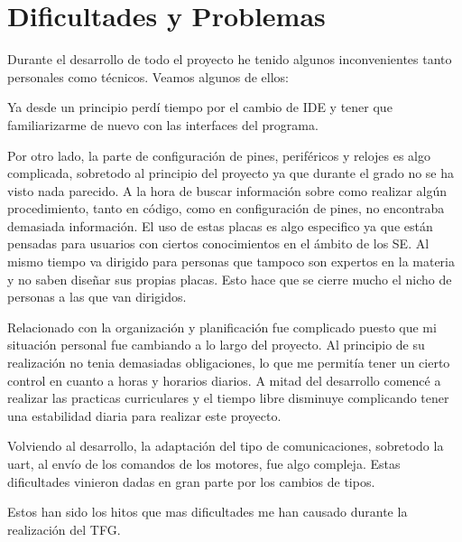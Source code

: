 \section{Dificultades y Problemas}\label{sec:ARDificultades}
Durante el desarrollo de todo el proyecto he tenido algunos inconvenientes tanto personales como técnicos. Veamos algunos de ellos:
\begin{description}
\item Ya desde un principio perdí tiempo por el cambio de IDE y tener que familiarizarme de nuevo con las interfaces del programa. 
\item Por otro lado, la parte de configuración de pines, periféricos y relojes es algo complicada, sobretodo al principio del proyecto ya que durante el grado no se ha visto nada parecido. A la hora de buscar información sobre como realizar algún procedimiento, tanto en código, como en configuración de pines, no encontraba demasiada información. El uso de estas placas es algo especifico ya que están pensadas para usuarios con ciertos conocimientos en el ámbito de los SE. Al mismo tiempo va dirigido para personas que tampoco son expertos en la materia y no saben diseñar sus propias placas. Esto hace que se cierre mucho el nicho de personas a las que van dirigidos.
\item Relacionado con la organización y planificación fue complicado puesto que mi situación personal fue cambiando a lo largo del proyecto. Al principio de su realización no tenia demasiadas obligaciones, lo que me permitía tener un cierto control en cuanto a horas y horarios diarios. A mitad del desarrollo comencé a realizar las practicas curriculares y el tiempo libre disminuye complicando tener una estabilidad diaria para realizar este proyecto.
\item Volviendo al desarrollo, la adaptación del tipo de comunicaciones, sobretodo la uart, al envío de los comandos de los motores, fue algo compleja. Estas dificultades vinieron dadas en gran parte por los cambios de tipos.
\end{description}
Estos han sido los hitos que mas dificultades me han causado durante la realización del TFG.










